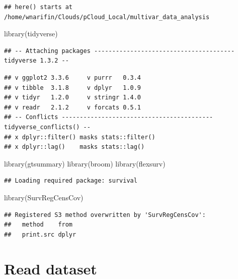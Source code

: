 \documentclass[
  10pt,
]{krantz}
\newenvironment{Shaded}{\begin{snugshade}}{\end{snugshade}}
\newcommand{\FunctionTok}[1]{\textcolor[rgb]{0.00,0.00,0.00}{#1}}
\newcommand{\NormalTok}[1]{#1}
\begin{document}
\begin{verbatim}
## here() starts at /home/wnarifin/Clouds/pCloud_Local/multivar_data_analysis
\end{verbatim}

\begin{Shaded}
\begin{Highlighting}[]
\FunctionTok{library}\NormalTok{(tidyverse)}
\end{Highlighting}
\end{Shaded}

\begin{verbatim}
## -- Attaching packages --------------------------------------- tidyverse 1.3.2 --
\end{verbatim}

\begin{verbatim}
## v ggplot2 3.3.6     v purrr   0.3.4
## v tibble  3.1.8     v dplyr   1.0.9
## v tidyr   1.2.0     v stringr 1.4.0
## v readr   2.1.2     v forcats 0.5.1
## -- Conflicts ------------------------------------------ tidyverse_conflicts() --
## x dplyr::filter() masks stats::filter()
## x dplyr::lag()    masks stats::lag()
\end{verbatim}

\begin{Shaded}
\begin{Highlighting}[]
\FunctionTok{library}\NormalTok{(gtsummary)}
\FunctionTok{library}\NormalTok{(broom)}
\FunctionTok{library}\NormalTok{(flexsurv)}
\end{Highlighting}
\end{Shaded}

\begin{verbatim}
## Loading required package: survival
\end{verbatim}

\begin{Shaded}
\begin{Highlighting}[]
\FunctionTok{library}\NormalTok{(SurvRegCensCov)}
\end{Highlighting}
\end{Shaded}

\begin{verbatim}
## Registered S3 method overwritten by 'SurvRegCensCov':
##   method    from 
##   print.src dplyr
\end{verbatim}

\hypertarget{read-dataset-1}{%
\section{Read dataset}\label{read-dataset-1}}
\end{document}

